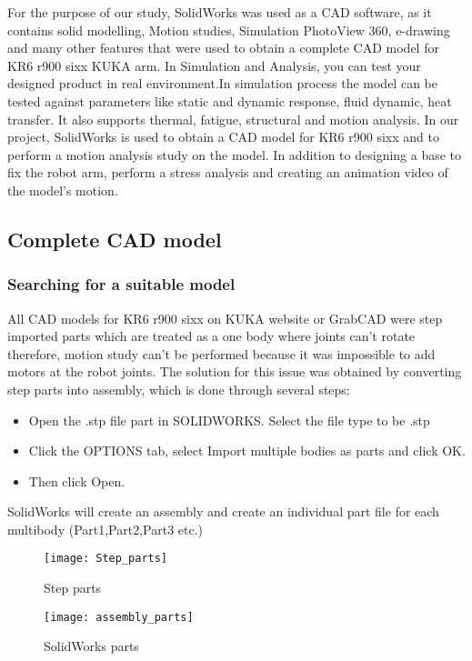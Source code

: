 \documentclass{book}
\author{}
\begin{document}
\maketitle

For the purpose of our study, SolidWorks was used as a CAD software, as it contains solid modelling, Motion studies, Simulation PhotoView 360, e-drawing and many other features that were used to obtain a complete CAD model for KR6 r900 sixx KUKA arm. 
\newline In Simulation and Analysis, you can test your designed product in real environment.In simulation process the model can be tested against parameters like static and dynamic response, fluid dynamic, heat transfer. It also supports thermal, fatigue, structural and motion analysis. 
\newline In our project, SolidWorks is used to obtain a CAD model for KR6 r900 sixx and to perform a motion analysis study on the model. In addition to designing a base to fix the robot arm, perform a stress analysis and creating an animation video of the model’s motion.

\subsection{Complete CAD model}

\subsubsection{Searching for a suitable model}
All CAD models for KR6 r900 sixx on KUKA website or GrabCAD were step imported parts which are treated as a one body where joints can’t rotate therefore, motion study can’t be performed because it was impossible to add motors at the robot joints. The solution for this issue was obtained by converting step parts into assembly, which is done through several steps:
\begin{itemize}
	\item Open the .stp file part in SOLIDWORKS.  Select the file type to be .stp
	\item Click the OPTIONS tab, select Import multiple bodies as parts and click OK.
	\item Then click Open.
\end{itemize}
SolidWorks will create an assembly and create an individual part file for each multibody (Part1,Part2,Part3 etc.)
\begin{figure}[h]
	
	\caption{Step parts}
	\centering
	\texttt{[image: Step\_parts]}
\end{figure}
\begin{figure}[h]
	
	\caption{SolidWorks parts}
	\centering
	\texttt{[image: assembly\_parts]}
\end{figure}
\end{document}
